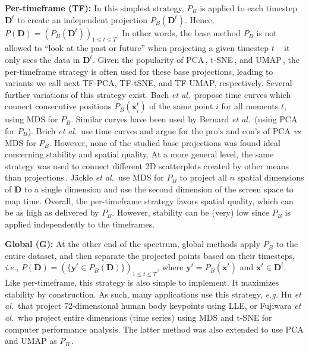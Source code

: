 \noindent\textbf{Per-timeframe (TF):} 
In this simplest strategy, $P_B$ is applied to each timestep $\mathbf{D}^t$ to create an independent projection $P_B(\mathbf{D}^t)$. Hence, $P(\mathbf{D}) = ( P_B(\mathbf{D}^t))_{ 1 \leq t \leq T}$. In other words, the base method $P_B$ is not allowed to ``look at the past or future'' when projecting a given timestep $t$ -- it only sees the data in $\mathbf{D}^t$. Given the popularity of PCA\,\cite{pca}, t-SNE\,\cite{vanderMaaten2008}, and UMAP\,\cite{mcinnes2018umap}, the per-timeframe strategy is often used for these base projections, leading to variants we call next TF-PCA, TF-tSNE, and TF-UMAP, respectively. Several further variations of this strategy exist. Bach \emph{et al.}\,\cite{bsk16} propose time curves which connect consecutive positions $P_B(\mathbf{x}_i^t)$ of the same point $i$ for all moments $t$, using MDS for $P_B$. Similar curves have been used by Bernard \emph{et al.}\,\cite{bws12} (using PCA for $P_B$). Brich \emph{et al.}\,\cite{Brich2020} use time curves and argue for the pro's and con's of PCA \emph{vs} MDS for $P_B$. However, none of the studied base projections was found ideal concerning stability and spatial quality. At a more general level, the same strategy was used to connect different 2D scatterplots created by other means than projections\,\cite{hkf16}. J{\"a}ckle \emph{et al.}\,\cite{Jackle2016} use MDS for $P_B$ to project all $n$ spatial dimensions of $\mathbf{D}$ to a single dimension and use the second dimension of the screen space to map time. 
Overall, the per-timeframe strategy favors spatial quality, which can be as high as delivered by $P_B$. However, stability can be (very) low since $P_B$ is applied independently to the timeframes. 

\noindent\textbf{Global (G):}
At the other end of the spectrum, global methods apply $P_B$ to the entire dataset, and then separate the projected points based on their timesteps, \emph{i.e.}, $P(\mathbf{D}) = (\{\mathbf{y}^t \in P_B(\mathbf{D})\})_{1 \leq t \leq T}$, where $\mathbf{y}^t = P_B(\mathbf{x}^t)$ and $\mathbf{x}^t \in \mathbf{D}^t$. Like per-timeframe, this strategy is also simple to implement. It maximizes stability by construction. As such, many applications use this strategy, \emph{e.g.} Hu \emph{et al.}\,\cite{Hu2010} that project 72-dimensional human body keypoints using LLE, or Fujiwara \emph{et al.}\,\cite{Fujiwara2018} who project entire dimensions (time series) using MDS and t-SNE for computer performance analysis. The latter method was also extended to use PCA and UMAP as $P_B$\,\cite{Fujiwara2020}.


